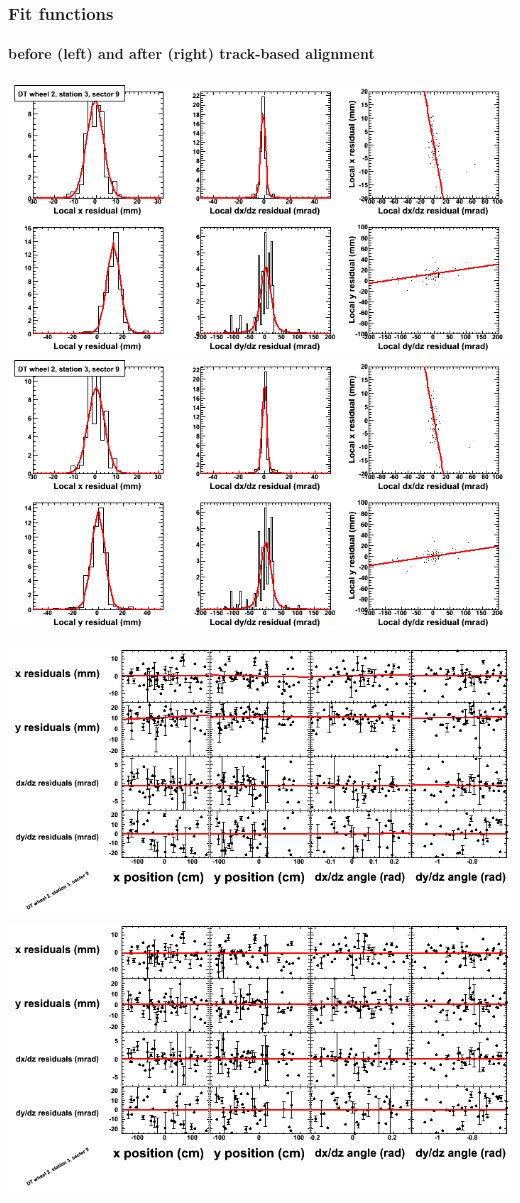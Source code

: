 \documentclass[compress]{beamer}
\begin{document}
\begin{frame}
\frametitle{Fit functions}
\framesubtitle{before (left) and after (right) track-based alignment}
\includegraphics[width=0.5\linewidth]{fitfunctions_re01/MBwhEst3sec09_bellcurves.png} \includegraphics[width=0.5\linewidth]{fitfunctions_re05/MBwhEst3sec09_bellcurves.png}

\includegraphics[width=0.5\linewidth]{fitfunctions_re01/MBwhEst3sec09_polynomials.png} \includegraphics[width=0.5\linewidth]{fitfunctions_re05/MBwhEst3sec09_polynomials.png}
\end{frame}
\end{document}
